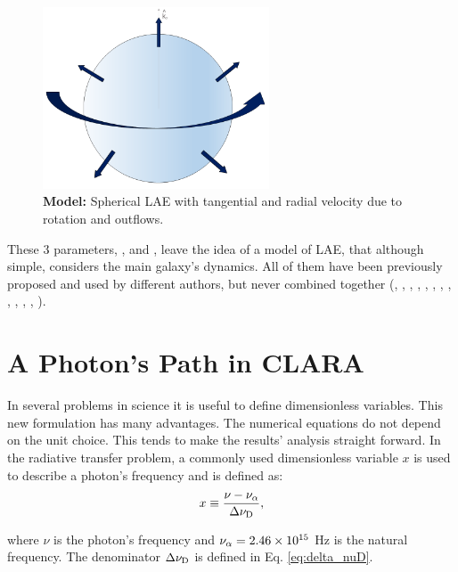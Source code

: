 \begin{figure}[h!]
	\begin{center}
		\includegraphics[width=0.6\textwidth]{./figures/chapter2/model}
	\end{center}
	\caption{\textbf{Model:} Spherical LAE with tangential and radial velocity due to rotation and outflows.
		\label{fig:model}}
\end{figure}

These 3 parameters, \vrot, \vout and \tauh, leave the idea of a model of LAE, that although simple, considers the main galaxy's dynamics. All of them have been previously proposed and used by different authors, but never combined together (\cite{Adams72}, \cite{Harrington73}, \cite{Neufeld90}, \cite{Dijkstra06}, \cite{Verhamme06}, \cite{Forero12}, \cite{Martin2015}, \cite{Garavito14}, \cite{Neufeld91}, \cite{Laursen09}, \cite{Barnes11}, \cite{Verhamme12}, \cite{Yajima12}).\\

\section{A \lya Photon's Path in CLARA}
In several problems in science it is useful to define dimensionless variables. This new formulation has many advantages. The numerical equations do not depend on the unit choice. This tends to make the results' analysis straight forward. In the \lya radiative transfer problem, a commonly used dimensionless variable $x$ is used to describe a photon's frequency and is defined as:\\

\begin{equation}
\label{eq:x_freq}
x \equiv \frac{\nu -\nu_{\rm \alpha}}{\Delta\nu_{\rm D}},
\end{equation} 

where $\nu$ is the photon's frequency and $\nu_{\rm \alpha} = 2.46\times 10^{15}$ Hz is the \lya natural frequency. The denominator $\Delta\nu_{\rm D}$ is defined in Eq. \ref{eq:delta_nuD}.

